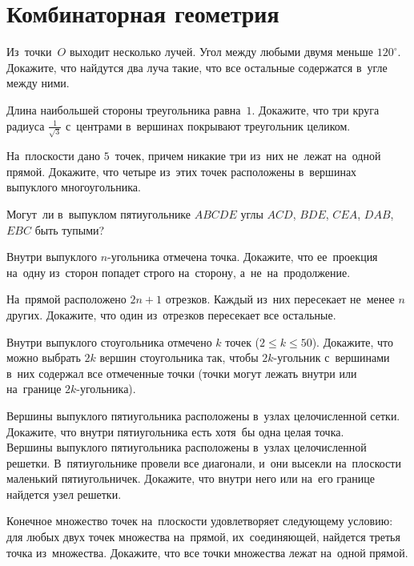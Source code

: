 
\section*{Комбинаторная геометрия}


\begin{problems}

\item
Из~точки~$O$ выходит несколько лучей.
Угол между любыми двумя меньше $120^{\circ}$.
Докажите, что найдутся два луча такие, что все остальные содержатся в~угле
между ними.

\item
Длина наибольшей стороны треугольника равна~$1$.
Докажите, что три круга радиуса $\frac{1}{\sqrt{3}}$ с~центрами в~вершинах
покрывают треугольник целиком.

\item
На~плоскости дано $5$~точек, причем никакие три из~них не~лежат на~одной
прямой.
Докажите, что четыре из~этих точек расположены в~вершинах выпуклого
многоугольника.

\item
Могут~ли в~выпуклом пятиугольнике $ABCDE$ углы $ACD$, $BDE$, $CEA$, $DAB$,
$EBC$ быть тупыми?

\item
Внутри выпуклого $n$-угольника отмечена точка.
Докажите, что ее~проекция на~одну из~сторон попадет строго на~сторону,
а~не~на~продолжение.


\item
На~прямой расположено $2 n + 1$ отрезков.
Каждый из~них пересекает не~менее $n$ других.
Докажите, что один из~отрезков пересекает все остальные.

\item
Внутри выпуклого стоугольника отмечено $k$ точек ($2 \leq k \leq 50$).
Докажите, что можно выбрать $2 k$ вершин стоугольника так, чтобы $2 k$-угольник
с~вершинами в~них содержал все отмеченные точки (точки могут лежать внутри или
на~границе $2 k$-угольника).

\item
\subproblem
Вершины выпуклого пятиугольника расположены в~узлах целочисленной сетки.
Докажите, что внутри пятиугольника есть хотя~бы одна целая точка.
\\
\subproblem
Вершины выпуклого пятиугольника расположены в~узлах целочисленной решетки.
В~пятиугольнике провели все диагонали, и~они высекли на~плоскости маленький
пятиугольничек.
Докажите, что внутри него или на~его границе найдется узел решетки.

\item
Конечное множество точек на~плоскости удовлетворяет следующему условию: для
любых двух точек множества на~прямой, их~соединяющей, найдется третья точка
из~множества.
Докажите, что все точки множества лежат на~одной прямой.

\end{problems}

